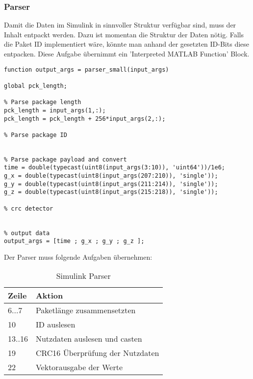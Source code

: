 \subsubsection{Parser}
Damit die Daten im Simulink in sinnvoller Struktur verfügbar sind, muss der Inhalt entpackt werden. Dazu ist momentan die Struktur der Daten nötig. Falls die Paket ID implementiert wäre, könnte man anhand der gesetzten ID-Bits diese entpacken. Diese Aufgabe übernimmt ein 'Interpreted MATLAB Function' Block. 


\begin{lstlisting}
function output_args = parser_small(input_args)

global pck_length;

% Parse package length
pck_length = input_args(1,:);
pck_length = pck_length + 256*input_args(2,:);

% Parse package ID


% Parse package payload and convert
time = double(typecast(uint8(input_args(3:10)), 'uint64'))/1e6;
g_x = double(typecast(uint8(input_args(207:210)), 'single'));
g_y = double(typecast(uint8(input_args(211:214)), 'single'));
g_z = double(typecast(uint8(input_args(215:218)), 'single'));    

% crc detector


% output data
output_args = [time ; g_x ; g_y ; g_z ];            
\end{lstlisting}
\medskip

\noindent Der Parser muss folgende Aufgaben übernehmen:
\begin{table}[ht]
\begin{center}
  \begin{tabular}{| l | l | }
    \hline
    Zeile & Aktion \\
    \hline
    6...7  & Paketlänge zusammensetzten \\
    \hline
    10  & ID auslesen \\
    \hline
    13..16  & Nutzdaten auslesen und casten \\
    \hline
    19  & CRC16 Überprüfung der Nutzdaten \\
    \hline 
    22  & Vektorausgabe der Werte \\
    \hline 
  \end{tabular}
  
  \caption{Simulink Parser}
  \label{tab:Simulink Parser}
  
\end{center}
\end{table}





\clearpage